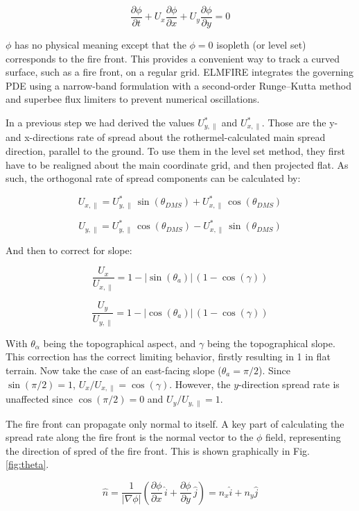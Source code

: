 \[
\frac{\partial \phi}{\partial t}
+ U_x \frac{\partial \phi}{\partial x}
+ U_y \frac{\partial \phi}{\partial y}
= 0
\]

$\phi$ has no physical meaning except that the $\phi = 0$ isopleth (or level set) corresponds to the fire front. This provides a convenient way to track a curved surface, such as a fire front, on a regular grid. ELMFIRE integrates the governing PDE using a narrow-band formulation \cite{sethianFastMarchingLevel1996} with a second-order Runge--Kutta method and superbee flux limiters to prevent numerical oscillations.

In a previous step we had derived the values $U^{*}_{y,\parallel}$ and $U^{*}_{x,\parallel}$. Those are the y- and x-directions rate of spread about the rothermel-calculated main spread direction, parallel to the ground. To use them in the level set method, they first have to be realigned about the main coordinate grid, and then projected flat. As such, the orthogonal rate of spread components can be calculated by:

\[
U_{x,\parallel} = U^{*}_{y,\parallel}\,\sin(\theta_{DMS})
                 + U^{*}_{x,\parallel}\,\cos(\theta_{DMS})
\]

\[
U_{y,\parallel} = U^{*}_{y,\parallel}\,\cos(\theta_{DMS})
                 - U^{*}_{x,\parallel}\,\sin(\theta_{DMS})
\]

And then to correct for slope:

\[
\frac{U_{x}}{U_{x,\parallel}} 
= 1 - \left| \sin(\theta_{a}) \right|\,(1 - \cos(\gamma))
\]

\[
\frac{U_{y}}{U_{y,\parallel}} 
= 1 - \left| \cos(\theta_{a}) \right|\,(1 - \cos(\gamma))
\]

With $\theta_\alpha$ being the topographical aspect, and $\gamma$ being the topographical slope. This correction has the correct limiting behavior, firstly resulting in 1 in flat terrain. Now take the case of an east-facing slope ($\theta_a = \pi/2$). Since $\sin(\pi/2) = 1$, $U_x / U_{x,\parallel} = \cos(\gamma)$.
However, the $y$-direction spread rate is unaffected since $\cos(\pi/2) = 0$
and $U_y / U_{y,\parallel} = 1$.

The fire front can propagate only normal to itself. A key part of calculating the spread rate along the fire front is the normal vector to the $\phi$ field, representing the direction of spred of the fire front. This is shown graphically in Fig. \ref{fig:theta}. 

\[
\hat{n}
= \frac{1}{|\nabla \phi|}
\left(
\frac{\partial \phi}{\partial x}\,\hat{i}
+
\frac{\partial \phi}{\partial y}\,\hat{j}
\right)
= n_x \hat{i} + n_y \hat{j}
\]

